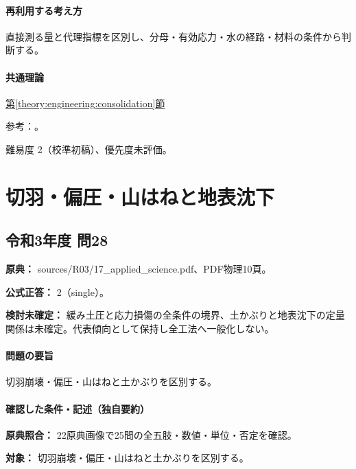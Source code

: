\paragraph{再利用する考え方} 直接測る量と代理指標を区別し、分母・有効応力・水の経路・材料の条件から判断する。

\paragraph{共通理論} \hyperref[theory:engineering:consolidation]{第\ref*{theory:engineering:consolidation}節}

\par 参考：\cite{eng52_subsidence_ref,eng52_consolidation}。

\par 難易度 2（校準初稿）、優先度未評価。

\section{切羽・偏圧・山はねと地表沈下}

\subsection{令和3年度 問28}
\label{q:r03-reg-applied-28}

\noindent\textbf{原典：} sources/R03/17\_applied\_science.pdf、PDF物理10頁。

\textbf{公式正答：} 2（single）。

\par\textbf{検討未確定：} 緩み土圧と応力損傷の全条件の境界、土かぶりと地表沈下の定量関係は未確定。代表傾向として保持し全工法へ一般化しない。

\paragraph{問題の要旨} 切羽崩壊・偏圧・山はねと土かぶりを区別する。

\paragraph{確認した条件・記述（独自要約）}\mbox{}\par

\noindent\textbf{原典照合：} 22原典画像で25問の全五肢・数値・単位・否定を確認。\par

\noindent\textbf{対象：} 切羽崩壊・偏圧・山はねと土かぶりを区別する。\par

